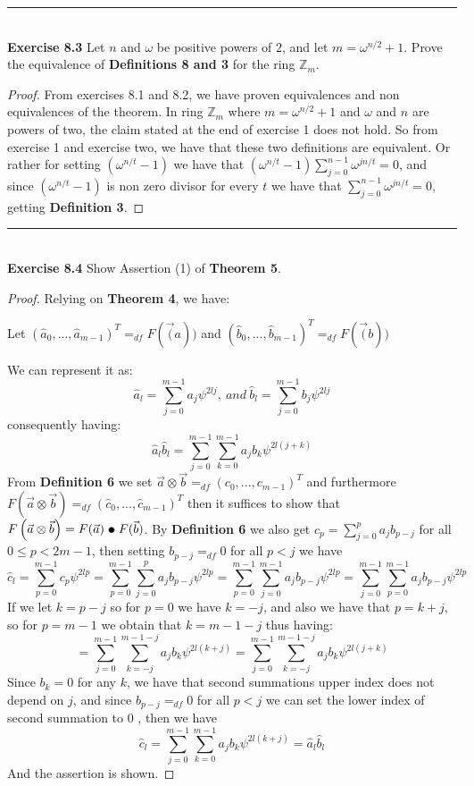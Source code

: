 \documentclass[a4paper]{article}
\begin{document}
\noindent\rule{12cm}{0.4pt}\\
\noindent \textbf{Exercise 8.3} Let $n$ and $\omega$ be positive powers of $2$, and let $m = \omega^{n/2} + 1$. Prove the equivalence of \textbf{Definitions 8 and 3} for the ring $\mathbb{Z}_{m}$.
\begin{proof}
From exercises 8.1 and 8.2, we have proven equivalences and non equivalences of the theorem. In ring $\mathbb{Z}_{m}$ where $m=\omega^{n/2}+1$ and $\omega$ and $n$ are powers of two, the claim stated at the end of exercise 1 does not hold. So from exercise 1 and exercise two, we have that these two definitions are equivalent. Or rather for setting $(\omega^{n/t}-1)$ we have that $(\omega^{n/t}-1)\sum^{n-1}_{j=0}\omega^{jn/t}=0$, and since $(\omega^{n/t}-1)$ is non zero divisor for every $t$ we have that $\sum^{n-1}_{j=0}\omega^{jn/t}=0$, getting \textbf{Definition 3}.
\end{proof}



\noindent\rule{12cm}{0.4pt}\\
\noindent \textbf{Exercise 8.4}  Show Assertion (1) of \textbf{Theorem 5}.
\begin{proof}
Relying on \textbf{Theorem 4}, we have:
\begin{center}
Let $(\widehat{a}_0,...,\widehat{a}_{m-1})^{T} =_{df}F(\vec(a))$ and $(\widehat{b}_0,...,\widehat{b}_{m-1})^{T} =_{df}F(\vec(b))$
\end{center}
We can represent it as:
$$\widehat{a}_l = \sum_{j=0}^{m-1}a_j\psi^{2lj},\ and\ \widehat{b}_l = \sum_{j=0}^{m-1}b_j\psi^{2lj}$$
consequently having:
$$\widehat{a}_l\widehat{b}_l = \sum_{j=0}^{m-1}\sum_{k=0}^{m-1}a_jb_k\psi^{2l(j+k)}$$
From \textbf{Definition 6} we set $\vec{a} \otimes \vec{b} =_{df}(c_0,...,c_{m-1})^T$ and furthermore $F\left(\vec{a} \otimes \vec{b}\right) =_{df}(\widehat{c}_0,...,\widehat{c}_{m-1})^T$ then it suffices to show that $F\left(\vec{a} \otimes \vec{b}\right) = F(\vec{a})\ \tikz\draw[black,fill=black] (0,0) circle (.5ex);\ F(\vec{b})$. By \textbf{Definition 6} we also get $c_{p}=  \sum_{j=0}^{p}a_{j}b_{p-j}$ for all $ 0 \leq p < 2m-1$, then setting $b_{p-j} =_{df} 0$ for all $p < j$ we have
$$\widehat{c}_l = \sum_{p=0}^{m-1}c_p\psi^{2lp} =  \sum_{p=0}^{m-1}\sum_{j=0}^{p}a_{j}b_{p-j}\psi^{2lp} =  \sum_{p=0}^{m-1}\sum_{j=0}^{m-1}a_{j}b_{p-j}\psi^{2lp} =  \sum_{j=0}^{m-1}\sum_{p=0}^{m-1}a_{j}b_{p-j}\psi^{2lp}$$
If we let $k = p-j$ so for $p =0$ we have $ k = -j$, and also we have that $p=k+j$, so for $p = m - 1$ we obtain that $k = m - 1 - j$ thus having:
$$=  \sum_{j=0}^{m-1}\sum_{k= -j}^{m-1-j}a_{j}b_{k}\psi^{2l(k+j)} = \sum_{j=0}^{m-1}\sum_{k= -j}^{m-1-j}a_{j}b_{k}\psi^{2l(j+k)}$$
Since $b_{k}=0$ for any $k$, we have that second summations upper index does not depend on $j$, and since $b_{p-j} =_{df} 0$ for all $p < j$ we can set the lower index of second summation to 0 , then we have
$$\widehat{c}_l  =  \sum_{j=0}^{m-1}\sum_{k= 0}^{m-1}a_{j}b_{k}\psi^{2l(k+j)}=\widehat{a}_l\widehat{b}_l$$
And the assertion is shown.
\end{proof}
\end{document}
